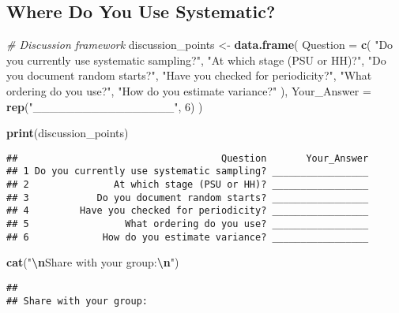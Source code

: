 \documentclass[
]{article}
\newenvironment{Shaded}{\begin{snugshade}}{\end{snugshade}}
\newcommand{\AttributeTok}[1]{\textcolor[rgb]{0.13,0.29,0.53}{#1}}
\newcommand{\CommentTok}[1]{\textcolor[rgb]{0.56,0.35,0.01}{\textit{#1}}}
\newcommand{\DecValTok}[1]{\textcolor[rgb]{0.00,0.00,0.81}{#1}}
\newcommand{\FunctionTok}[1]{\textcolor[rgb]{0.13,0.29,0.53}{\textbf{#1}}}
\newcommand{\NormalTok}[1]{#1}
\newcommand{\OtherTok}[1]{\textcolor[rgb]{0.56,0.35,0.01}{#1}}
\newcommand{\SpecialCharTok}[1]{\textcolor[rgb]{0.81,0.36,0.00}{\textbf{#1}}}
\newcommand{\StringTok}[1]{\textcolor[rgb]{0.31,0.60,0.02}{#1}}
\begin{document}
\subsection{Where Do You Use
Systematic?}\label{where-do-you-use-systematic}

\begin{Shaded}
\begin{Highlighting}[]
\CommentTok{\# Discussion framework}
\NormalTok{discussion\_points }\OtherTok{\textless{}{-}} \FunctionTok{data.frame}\NormalTok{(}
  \AttributeTok{Question =} \FunctionTok{c}\NormalTok{(}
    \StringTok{"Do you currently use systematic sampling?"}\NormalTok{,}
    \StringTok{"At which stage (PSU or HH)?"}\NormalTok{,}
    \StringTok{"Do you document random starts?"}\NormalTok{,}
    \StringTok{"Have you checked for periodicity?"}\NormalTok{,}
    \StringTok{"What ordering do you use?"}\NormalTok{,}
    \StringTok{"How do you estimate variance?"}
\NormalTok{  ),}
  \AttributeTok{Your\_Answer =} \FunctionTok{rep}\NormalTok{(}\StringTok{"\_\_\_\_\_\_\_\_\_\_\_\_\_\_\_\_\_"}\NormalTok{, }\DecValTok{6}\NormalTok{)}
\NormalTok{)}

\FunctionTok{print}\NormalTok{(discussion\_points)}
\end{Highlighting}
\end{Shaded}

\begin{verbatim}
##                                    Question       Your_Answer
## 1 Do you currently use systematic sampling? _________________
## 2               At which stage (PSU or HH)? _________________
## 3            Do you document random starts? _________________
## 4         Have you checked for periodicity? _________________
## 5                 What ordering do you use? _________________
## 6             How do you estimate variance? _________________
\end{verbatim}

\begin{Shaded}
\begin{Highlighting}[]
\FunctionTok{cat}\NormalTok{(}\StringTok{"}\SpecialCharTok{\textbackslash{}n}\StringTok{Share with your group:}\SpecialCharTok{\textbackslash{}n}\StringTok{"}\NormalTok{)}
\end{Highlighting}
\end{Shaded}

\begin{verbatim}
## 
## Share with your group:
\end{verbatim}
\end{document}
